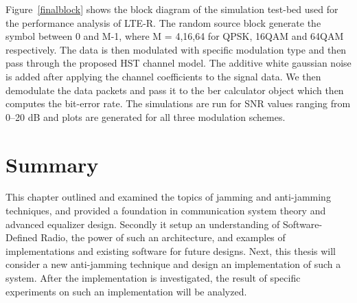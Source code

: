 Figure~\ref{finalblock} shows the block diagram of the simulation test-bed used for the performance analysis of LTE-R. The random source block generate the symbol between 0 and M-1, where M = 4,16,64 for QPSK, 16QAM and 64QAM respectively. The data is then modulated with specific modulation type and then pass through the proposed HST channel model. The additive white gaussian noise is added after applying the channel coefficients to the signal data. We then demodulate the data packets and pass it to the ber calculator object which then computes the bit-error rate. The simulations are run for SNR values ranging from 0--20 dB and plots are generated for all three modulation schemes.

\section{Summary}
This chapter outlined and examined the topics of jamming and anti-jamming techniques, and provided a foundation in communication system theory and advanced equalizer design.  Secondly it setup an understanding of Software-Defined Radio, the power of such an architecture, and examples of implementations and existing software for future designs.  Next, this thesis will consider a new anti-jamming technique and design an implementation of such a system.  After the implementation is investigated, the result of specific experiments on such an implementation will be analyzed.\\
